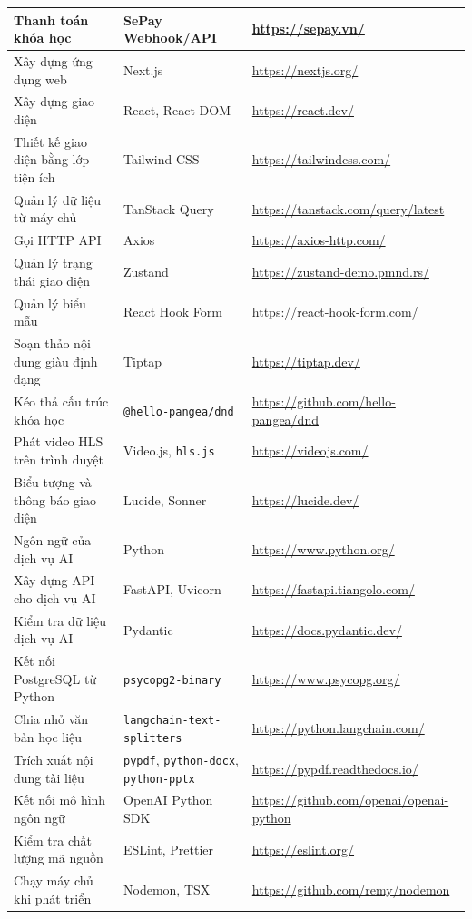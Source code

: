 \documentclass[../DoAn.tex]{subfiles}
\begin{document}
{\begin{longtable}{|p{}|p{}|p{}|}
Thanh toán khóa học & SePay Webhook/API & \url{https://sepay.vn/} \\ \hline
Xây dựng ứng dụng web & Next.js & \url{https://nextjs.org/} \\ \hline
Xây dựng giao diện & React, React DOM & \url{https://react.dev/} \\ \hline
Thiết kế giao diện bằng lớp tiện ích & Tailwind CSS & \url{https://tailwindcss.com/} \\ \hline
Quản lý dữ liệu từ máy chủ & TanStack Query & \url{https://tanstack.com/query/latest} \\ \hline
Gọi HTTP API & Axios & \url{https://axios-http.com/} \\ \hline
Quản lý trạng thái giao diện & Zustand & \url{https://zustand-demo.pmnd.rs/} \\ \hline
Quản lý biểu mẫu & React Hook Form & \url{https://react-hook-form.com/} \\ \hline
Soạn thảo nội dung giàu định dạng & Tiptap & \url{https://tiptap.dev/} \\ \hline
Kéo thả cấu trúc khóa học & \texttt{@hello-pangea/dnd} & \url{https://github.com/hello-pangea/dnd} \\ \hline
Phát video HLS trên trình duyệt & Video.js, \texttt{hls.js} & \url{https://videojs.com/} \\ \hline
Biểu tượng và thông báo giao diện & Lucide, Sonner & \url{https://lucide.dev/} \\ \hline
Ngôn ngữ của dịch vụ AI & Python & \url{https://www.python.org/} \\ \hline
Xây dựng API cho dịch vụ AI & FastAPI, Uvicorn & \url{https://fastapi.tiangolo.com/} \\ \hline
Kiểm tra dữ liệu dịch vụ AI & Pydantic & \url{https://docs.pydantic.dev/} \\ \hline
Kết nối PostgreSQL từ Python & \texttt{psycopg2-binary} & \url{https://www.psycopg.org/} \\ \hline
Chia nhỏ văn bản học liệu & \texttt{langchain-text-splitters} & \url{https://python.langchain.com/} \\ \hline
Trích xuất nội dung tài liệu & \texttt{pypdf}, \texttt{python-docx}, \texttt{python-pptx} & \url{https://pypdf.readthedocs.io/} \\ \hline
Kết nối mô hình ngôn ngữ & OpenAI Python SDK & \url{https://github.com/openai/openai-python} \\ \hline
Kiểm tra chất lượng mã nguồn & ESLint, Prettier & \url{https://eslint.org/} \\ \hline
Chạy máy chủ khi phát triển & Nodemon, TSX & \url{https://github.com/remy/nodemon} \\ \hline
\end{longtable}
}
\end{document}
